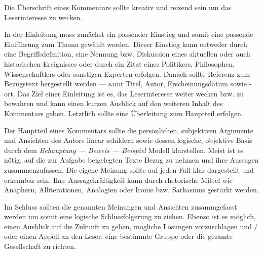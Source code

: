 \begin{enumerate}


	Die \"{U}berschrift eines Kommentars sollte kreativ und reizend sein um das Leserinteresse zu wecken.


	In der Einleitung muss zun\"{a}chst ein passender Einstieg und somit eine passende Einf\"{u}hrung zum Thema gew\"{a}hlt werden. Dieser Einstieg kann entweder durch eine Begriffsdefinition, eine Nennung bzw. Diskussion eines aktuellen oder auch historischen Ereignisses oder durch ein Zitat eines Politikers, Philosophen, Wissenschaftlers oder sonstigen Experten erfolgen. Danach sollte Referenz zum Bezugstext hergestellt werden --- samt Titel, Autor, Erscheinungsdatum sowie -ort. Das Ziel einer Einleitung ist es, das Leserinteresse weiter wecken bzw. zu bewahren und kann einen kurzen Ausblick auf den weiteren Inhalt des Kommentars geben. Letztlich sollte eine \"{U}berleitung zum Hauptteil erfolgen. 


	Der Hauptteil eines Kommentars sollte die pers\"{o}nlichen, subjektiven Argumente und Ansichten des Autors linear schildern sowie dessen logische, objektive Basis durch dem \emph{Behauptung --- Beweis --- Beispiel} Modell klarstellen. Meist ist es n\"{o}tig, auf die zur Aufgabe beigelegten Texte Bezug zu nehmen und ihre Aussagen zusammenzufassen. Die eigene Meinung sollte auf jeden Fall klar dargestellt und erkennbar sein. Ihre Aussagekr\"{a}ftigkeit kann durch rhetorische Mittel wie Anaphern, Alliterationen, Analogien oder Ironie bzw. Sarkasmus gest\"{a}rkt werden.


	Im Schluss sollten die genannten Meinungen und Ansichten zusammgefasst werden um somit eine logische Schlussfolgerung zu ziehen. Ebenso ist es m\"{o}glich, einen Ausblick auf die Zukunft zu geben, m\"{o}gliche L\"{o}sungen vorzuschlagen und / oder einen Appell an den Leser, eine bestimmte Gruppe oder die gesamte Gesellschaft zu richten.

\end{enumerate}

\pagebreak


